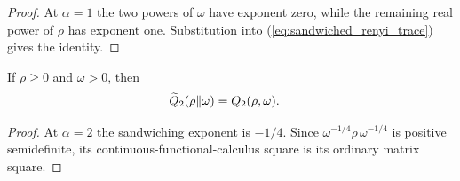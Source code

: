 \begin{proof}\leanok
    At $\alpha=1$ the two powers of $\omega$ have exponent zero, while the
    remaining real power of $\rho$ has exponent one.  Substitution into
    (\ref{eq:sandwiched_renyi_trace}) gives the identity.
\end{proof}

\begin{theorem}
    \label{thm:sandwiched_renyi_trace_two}
    \leanok
    If $\rho\geq0$ and $\omega>0$, then
    \begin{align}
        \widetilde Q_2(\rho\Vert\omega) & =Q_2(\rho,\omega).
        \notag
    \end{align}
\end{theorem}

\begin{proof}\leanok
    At $\alpha=2$ the sandwiching exponent is $-1/4$.
    Since $\omega^{-1/4}\rho\,\omega^{-1/4}$ is positive semidefinite, its
    continuous-functional-calculus square is its ordinary matrix square.
\end{proof}

